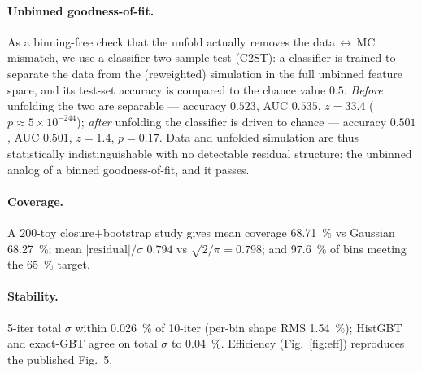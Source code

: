 
\paragraph{Unbinned goodness-of-fit.}
As a binning-free check that the unfold actually removes the data\,$\leftrightarrow$\,MC
mismatch, we use a classifier two-sample test (C2ST): a classifier is trained to separate the
data from the (reweighted) simulation in the full unbinned feature space, and its
test-set accuracy is compared to the chance value $0.5$. \emph{Before} unfolding the two are
separable --- accuracy $0.523$, AUC $0.535$, $z=33.4$ ($p\approx5\times10^{-244}$);
\emph{after} unfolding the classifier is driven to chance --- accuracy $0.501$, AUC $0.501$,
$z=1.4$, $p=0.17$. Data and unfolded simulation are thus statistically indistinguishable with
no detectable residual structure: the unbinned analog of a binned goodness-of-fit, and it
passes.

\paragraph{Coverage.}
A 200-toy closure$+$bootstrap study gives mean coverage
\SI{68.71}{\percent} vs Gaussian \SI{68.27}{\percent}; mean
$|\mathrm{residual}|/\sigma$ $0.794$ vs $\sqrt{2/\pi}=0.798$; and
\SI{97.6}{\percent} of bins meeting the \SI{65}{\percent} target.

\paragraph{Stability.}
5-iter total $\sigma$ within \SI{0.026}{\percent} of 10-iter (per-bin shape RMS
\SI{1.54}{\percent}); HistGBT and exact-GBT agree on total $\sigma$ to
\SI{0.04}{\percent}. Efficiency (Fig.~\ref{fig:eff}) reproduces the published
Fig.~5.

